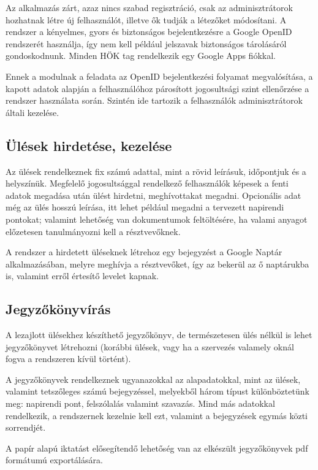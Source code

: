 \documentclass[a4paper,12pt,oneside]{report}
\begin{document}
Az alkalmazás zárt, azaz nincs szabad regisztráció, csak az adminisztrátorok hozhatnak létre új felhasználót, illetve ők tudják a létezőket módosítani. A rendszer a kényelmes, gyors és biztonságos bejelentkezésre a Google OpenID rendszerét használja, így nem kell például jelszavak biztonságos tárolásáról gondoskodnunk. Minden HÖK tag rendelkezik egy Google Apps fiókkal.

Ennek a modulnak a feladata az OpenID bejelentkezési folyamat megvalósítása, a kapott adatok alapján a felhasználóhoz párosított jogosultsági szint ellenőrzése a rendszer használata során. Szintén ide tartozik a felhasználók adminisztrátorok általi kezelése.

\subsection{Ülések hirdetése, kezelése}

Az ülések rendelkeznek fix számú adattal, mint a rövid leírásuk, időpontjuk és a helyszínük. Megfelelő jogosultsággal rendelkező felhasználók képesek a fenti adatok megadása után ülést hirdetni, meghívottakat megadni. Opcionális adat még az ülés hosszú leírása, itt lehet például megadni a tervezett napirendi pontokat; valamint lehetőség van dokumentumok feltöltésére, ha valami anyagot előzetesen tanulmányozni kell a résztvevőknek.

A rendszer a hirdetett üléseknek létrehoz egy bejegyzést a Google Naptár alkalmazásában, melyre meghívja a résztvevőket, így az bekerül az ő naptárukba is, valamint erről értesítő levelet kapnak.

\subsection{Jegyzőkönyvírás}

A lezajlott ülésekhez készíthető jegyzőkönyv, de természetesen ülés nélkül is lehet jegyzőkönyvet létrehozni (korábbi ülések, vagy ha a szervezés valamely oknál fogva a rendszeren kívül történt).

A jegyzőkönyvek rendelkeznek ugyanazokkal az alapadatokkal, mint az ülések, valamint tetszőleges számú bejegyzéssel, melyekből három típust különböztetünk meg: napirendi pont, felszólalás valamint szavazás. Mind más adatokkal rendelkezik, a rendszernek kezelnie kell ezt, valamint a bejegyzések egymás közti sorrendjét.

A papír alapú iktatást elősegítendő lehetőség van az elkészült jegyzőkönyvek pdf formátumú exportálására.
\end{document}
